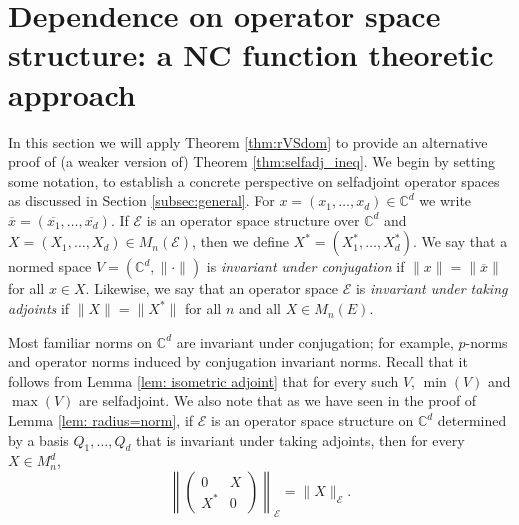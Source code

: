 \documentclass[12pt]{amsart}
\numberwithin{equation}{section}
\theoremstyle{definition}
\newcommand{\be}{\begin{equation}}
\newcommand{\ee}{\end{equation}}
\newcommand{\cE}{\mathcal{E}}
\newcommand{\bC}{\mathbb{C}}
\newcommand{\ol}{\overline}
\begin{document}
\section{Dependence on operator space structure: a NC function theoretic approach}\label{sec:dependence}

In this section we will apply Theorem \ref{thm:rVSdom} to provide an alternative proof of (a weaker version of) Theorem \ref{thm:selfadj_ineq}. 
We begin by setting some notation, to establish a concrete perspective on selfadjoint operator spaces as discussed in Section \ref{subsec:general}. 
For $x = (x_1, \ldots, x_d) \in \bC^d$ we write $\ol{x} = (\ol{x_1}, \ldots, \ol{x_d})$. 
If $\cE$ is an operator space structure over $\bC^d$ and $X = (X_1, \ldots, X_d) \in M_n(\cE)$, then we define $X^* = (X_1^*, \ldots, X_d^*)$. 
We say that a normed space $V = (\bC^d, \|\cdot\|)$ is {\em invariant under conjugation} if $\|x\| = \|\ol{x}\|$ for all $x \in X$. 
Likewise, we say that an operator space $\cE$ is {\em invariant under taking adjoints} if $\|X\| = \|X^*\|$ for all $n$ and all $X \in M_n(E)$. 

Most familiar norms on $\bC^d$ are invariant under conjugation; for example, $p$-norms and operator norms induced by conjugation invariant norms. Recall that it follows from Lemma \ref{lem: isometric adjoint} that for every such $V$, $\min(V)$ and $\max(V)$ are selfadjoint. We also note that as we have seen in the proof of Lemma \ref{lem: radius=norm}, if $\cE$ is an operator space structure on $\bC^d$ determined by a basis $Q_1, \ldots, Q_d$ that is invariant under taking adjoints, then for every $X \in M_n^d$, 
    \be\label{eq:norm_adj}
    \left\| \begin{pmatrix} 0 & X \\ X^* & 0 \end{pmatrix} \right\|_{\cE} = \|X\|_\cE. 
    \ee
\end{document}
